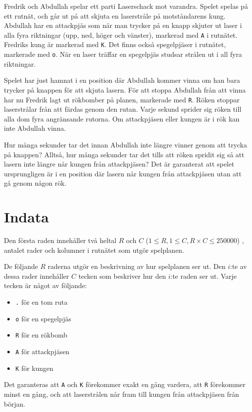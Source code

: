Fredrik och Abdullah spelar ett parti Laserschack mot varandra. Spelet spelas på ett rutnät,
och går ut på att skjuta en laserstråle på motståndarens kung.
Abdullah har en attackpjäs som när man trycker på en knapp skjuter ut laser i alla fyra riktningar (upp, ned, höger och vänster), markerad med \texttt{A} i rutnätet.
Fredriks kung är markerad med \texttt{K}. Det finns också spegelpjäser i rutnätet, markerade med \texttt{o}.
När en laser träffar en spegelpjäs studsar strålen ut i all fyra riktningar.

Spelet har just hamnat i en position där Abdullah kommer vinna om han bara trycker på knappen för att skjuta lasern.
För att stoppa Abdullah från att vinna har nu Fredrik lagt ut rökbomber på planen, markerade med \texttt{R}.
Röken stoppar laserstrålar från att färdas genom den rutan. Varje sekund sprider sig röken till alla dom fyra angränsande rutorna.
Om attackpjäsen eller kungen är i rök kan inte Abdullah vinna. 

Hur många sekunder tar det innan Abdullah inte längre vinner genom att trycka på knappen?
Alltså, hur många sekunder tar det tills att röken spridit sig så att lasern inte längre når kungen från attackpjäsen?
Det är garanterat att spelet ursprungligen är i en position där lasern når kungen från attackpjäsen utan att gå genom någon rök.

\section*{Indata}
Den första raden innehåller två heltal $R$ och $C$ ($1\le R, 1 \le C, R\times C \le 250 000$) , antalet rader och kolumner i rutnätet som utgör spelplanen.

De följande $R$ raderna utgör en beskrivning av hur spelplanen ser ut.
Den $i$:te av dessa rader innehåller $C$ tecken som beskriver hur den $i$:te raden ser ut.
Varje tecken är något av följande:
\begin{itemize}
    \item \texttt{.} för en tom ruta
    \item \texttt{o} för en spegelpjäs
    \item \texttt{R} för en rökbomb
    \item \texttt{A} för attackpjäsen
    \item \texttt{K} för kungen
\end{itemize}
Det garanteras att \texttt{A} och \texttt{K} förekommer exakt en gång vardera,
att \texttt{R} förekommer minst en gång,
och att laserstrålen når fram till kungen från attackpjäsen från början.

